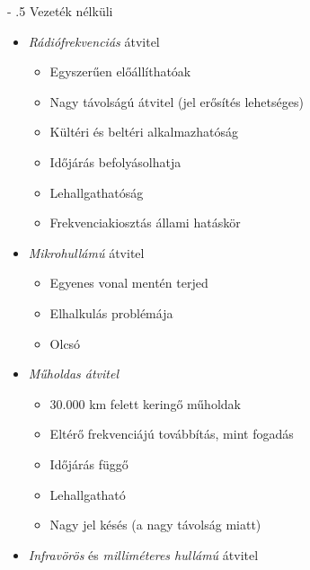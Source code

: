 \documentclass[12pt]{article}
\makeatletter
\renewcommand\paragraph{%
	\@startsection{paragraph}{4}{0mm}%
	{-\baselineskip}%
	{.5\baselineskip}%
	{\normalfont\normalsize\bfseries}}
\makeatother
\begin{document}
    \paragraph{Vezeték nélküli}

    \begin{itemize}[leftmargin=7.5mm]
        \renewcommand{\labelitemi}{$\vcenter{\hbox{\tiny$\bullet$}}$}
        \item \emph{Rádiófrekvenciás} átvitel
    	\begin{itemize}[leftmargin=7.5mm]
            \renewcommand{\labelitemii}{$\vcenter{\hbox{\tiny$\circ$}}$}
            \item Egyszerűen előállíthatóak
            \item Nagy távolságú átvitel (jel erősítés lehetséges)
            \item Kültéri és beltéri alkalmazhatóság \\
            \item Időjárás befolyásolhatja
            \item Lehallgathatóság
            \item Frekvenciakiosztás állami hatáskör
        \end{itemize}
        \item \emph{Mikrohullámú} átvitel
    	\begin{itemize}[leftmargin=7.5mm]
            \renewcommand{\labelitemii}{$\vcenter{\hbox{\tiny$\circ$}}$}
            \item Egyenes vonal mentén terjed
            \item Elhalkulás problémája
            \item Olcsó
        \end{itemize}
        \item \emph{Műholdas átvitel}
        \begin{itemize}
            \item 30.000 km felett keringő műholdak
            \item Eltérő frekvenciájú továbbítás, mint fogadás \\
            \item Időjárás függő
            \item Lehallgatható
            \item Nagy jel késés (a nagy távolság miatt)
        \end{itemize}
        \item \emph{Infravörös} és \emph{milliméteres hullámú} átvitel
    	\begin{itemize}[leftmargin=7.5mm]

\end{itemize}
\end{itemize}
\end{document}

